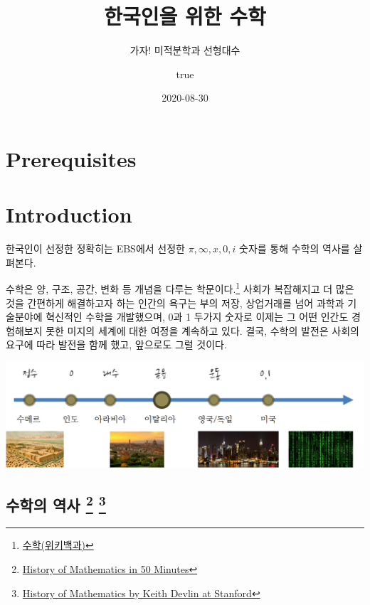 \documentclass[
]{book}
\title{한국인을 위한 수학}
\subtitle{가자! 미적분학과 선형대수}
\author{true}
\date{2020-08-30}
\begin{document}
\maketitle

{
\setcounter{tocdepth}{1}
\tableofcontents
}
\hypertarget{prerequisite}{%
\chapter*{Prerequisites}\label{prerequisite}}

\hypertarget{intro}{%
\chapter{Introduction}\label{intro}}

한국인이 선정한 정확히는 EBS에서 선정한 \(\pi, \infty, x, 0, i\) 숫자를 통해 수학의 역사를 살펴본다.

수학은 양, 구조, 공간, 변화 등 개념을 다루는 학문이다.\footnote{\href{https://ko.wikipedia.org/wiki/수학}{수학(위키백과)}} 사회가 복잡해지고 더 많은 것을 간편하게 해결하고자 하는 인간의 욕구는 부의 저장, 상업거래를 넘어 과학과 기술분야에 혁신적인 수학을 개발했으며, 0과 1 두가지 숫자로 이제는 그 어떤 인간도 경험해보지 못한 미지의 세계에 대한 여정을 계속하고 있다. 결국, 수학의 발전은 사회의 요구에 따라 발전을 함께 했고, 앞으로도 그럴 것이다.

\includegraphics{fig/math-history.png}

\hypertarget{uxc218uxd559uxc758-uxc5eduxc0ac-2-3}{%
\section[수학의 역사 ]{\texorpdfstring{수학의 역사 \footnote{\href{https://www.youtube.com/watch?v=YsEcpS-hyXw}{History of Mathematics in 50 Minutes}} \footnote{\href{https://www.youtube.com/watch?v=pk49iM9OT_0\&list=PLUSC1HoMnGTi7Q4T6FCYwifor9D8d03y3}{History of Mathematics by Keith Devlin at Stanford}}}{수학의 역사  }}\label{uxc218uxd559uxc758-uxc5eduxc0ac-2-3}}
\end{document}
